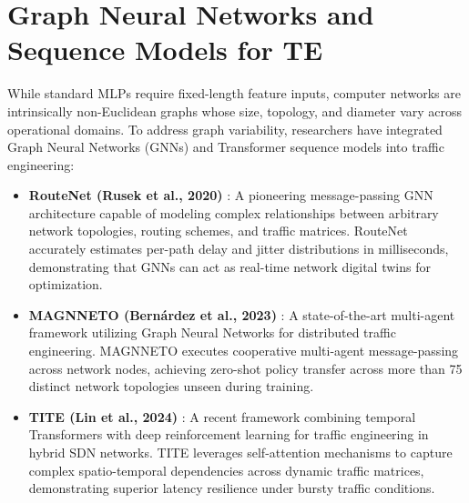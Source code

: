 \documentclass[12pt,a4paper,oneside]{report}
\begin{document}
\section{Graph Neural Networks and Sequence Models for TE}
\label{sec:lit_gnn_transformers}
While standard MLPs require fixed-length feature inputs, computer networks are intrinsically non-Euclidean graphs whose size, topology, and diameter vary across operational domains. To address graph variability, researchers have integrated Graph Neural Networks (GNNs) and Transformer sequence models into traffic engineering:
\begin{itemize}
  \item \textbf{RouteNet (Rusek et al., 2020)} \cite{rusek2020routenet}: A pioneering message-passing GNN architecture capable of modeling complex relationships between arbitrary network topologies, routing schemes, and traffic matrices. RouteNet accurately estimates per-path delay and jitter distributions in milliseconds, demonstrating that GNNs can act as real-time network digital twins for optimization.
  \item \textbf{MAGNNETO (Bernárdez et al., 2023)} \cite{bernardez2023magnneto}: A state-of-the-art multi-agent framework utilizing Graph Neural Networks for distributed traffic engineering. MAGNNETO executes cooperative multi-agent message-passing across network nodes, achieving zero-shot policy transfer across more than 75 distinct network topologies unseen during training.
  \item \textbf{TITE (Lin et al., 2024)} \cite{lin2024tite}: A recent framework combining temporal Transformers with deep reinforcement learning for traffic engineering in hybrid SDN networks. TITE leverages self-attention mechanisms to capture complex spatio-temporal dependencies across dynamic traffic matrices, demonstrating superior latency resilience under bursty traffic conditions.
\end{itemize}
\end{document}
